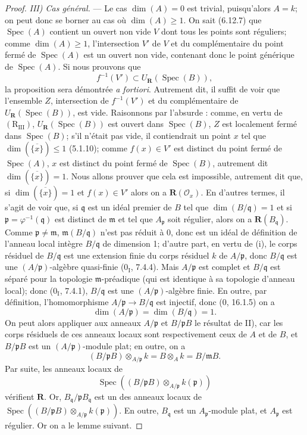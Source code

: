 \begin{proof}
\emph{III) Cas général.} --- Le cas $\dim(A)=0$ est trivial, puisqu'alors
$A=k$; on peut donc se borner au cas où $\dim(A)\geqslant1$. On sait
(6.12.7) que $\operatorname{Spec}(A)$ contient un ouvert non vide $V$ dont
tous les points sont réguliers; comme $\dim(A)\geqslant1$, l'intersection
$V'$ de $V$ et du complémentaire du point fermé de
$\operatorname{Spec}(A)$ est un ouvert non vide, contenant donc le point
générique de $\operatorname{Spec}(A)$. Si nous prouvons que
\[
f^{-1}(V')\subset U_{\boldsymbol R}(\operatorname{Spec}(B)),
\]
la proposition sera démontrée \emph{a fortiori}. Autrement dit, il suffit de
voir que l'ensemble $Z$, intersection de $f^{-1}(V')$ et du complémentaire
de $U_{\boldsymbol R}(\operatorname{Spec}(B))$, est vide. Raisonnons par
l'absurde : comme, en vertu de $(\mathrm R_{\mathrm{III}})$,
$U_{\boldsymbol R}(\operatorname{Spec}(B))$ est ouvert dans
$\operatorname{Spec}(B)$, $Z$ est localement fermé dans
$\operatorname{Spec}(B)$; s'il n'était pas vide, il contiendrait un point
$x$ tel que $\dim(\overline{\{x\}})\leqslant1$ (5.1.10); comme
$f(x)\in V'$ est distinct du point fermé de $\operatorname{Spec}(A)$, $x$
est distinct du point fermé de $\operatorname{Spec}(B)$, autrement dit
$\dim(\overline{\{x\}})=1$. Nous allons prouver que cela est impossible,
autrement dit que, si $\dim(\overline{\{x\}})=1$ et $f(x)\in V'$ alors on a
$\boldsymbol R(\mathscr O_x)$. En d'autres termes, il s'agit de voir que,
si $\mathfrak q$ est un idéal premier de $B$ tel que
$\dim(B/\mathfrak q)=1$ et si $\mathfrak p=\varphi^{-1}(\mathfrak q)$ est
distinct de $\mathfrak m$ et tel que $A_{\mathfrak p}$ soit régulier, alors
on a $\boldsymbol R(B_{\mathfrak q})$. Comme
$\mathfrak p\ne\mathfrak m$, $\mathfrak m(B/\mathfrak q)$ n'est pas réduit
à 0, donc est un idéal de définition de l'anneau local intègre
$B/\mathfrak q$ de dimension 1; d'autre part, en vertu de (i), le corps
résiduel de $B/\mathfrak q$ est une extension finie du corps résiduel $k$
de $A/\mathfrak p$, donc $B/\mathfrak q$ est une
$(A/\mathfrak p)$-algèbre quasi-finie (0$_{\mathrm I}$, 7.4.4). Mais
$A/\mathfrak p$ est complet et $B/\mathfrak q$ est séparé pour la topologie
$\mathfrak m$-préadique (qui est identique à sa topologie d'anneau local);
donc (0$_{\mathrm I}$, 7.4.1), $B/\mathfrak q$ est une
$(A/\mathfrak p)$-algèbre finie. En outre, par définition,
l'homomorphisme $A/\mathfrak p\to B/\mathfrak q$ est injectif, donc (0,
16.1.5) on a
\[
\dim(A/\mathfrak p)=\dim(B/\mathfrak q)=1.
\]
On peut alors appliquer aux anneaux $A/\mathfrak p$ et
$B/\mathfrak pB$ le résultat de II), car les corps résiduels de ces anneaux
locaux sont respectivement ceux de $A$ et de $B$, et $B/\mathfrak pB$ est
un $(A/\mathfrak p)$-module plat; en outre, on a
\[
(B/\mathfrak pB)\otimes_{A/\mathfrak p}k=B\otimes_A k=B/\mathfrak mB.
\]
Par suite, les anneaux locaux de
\[
\operatorname{Spec}((B/\mathfrak pB)
\otimes_{A/\mathfrak p}k(\mathfrak p))
\]
vérifient $\boldsymbol R$. Or, $B_{\mathfrak q}/\mathfrak pB_{\mathfrak q}$
est un des anneaux locaux de
$\operatorname{Spec}((B/\mathfrak pB)
\otimes_{A/\mathfrak p}k(\mathfrak p))$. En outre,
$B_{\mathfrak q}$ est un $A_{\mathfrak p}$-module plat, et
$A_{\mathfrak p}$ est régulier. Or on a le lemme suivant.


\end{proof}
